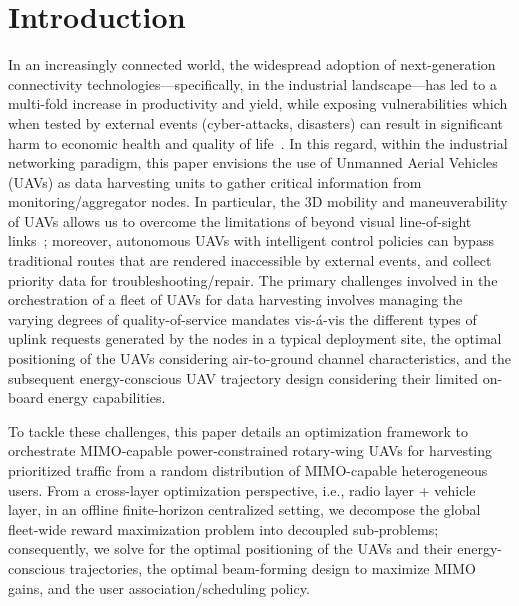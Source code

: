 \documentclass[10pt, twocolumn]{IEEEtran}
\begin{document}
\section{Introduction}\label{S1}
In an increasingly connected world, the widespread adoption of next-generation connectivity technologies---specifically, in the industrial landscape---has led to a multi-fold increase in productivity and yield, while exposing vulnerabilities which when tested by external events (cyber-attacks, disasters) can result in significant harm to economic health and quality of life~\cite{Motivation_1, Motivation_2}. In this regard, within the industrial networking paradigm, this paper envisions the use of Unmanned Aerial Vehicles (UAVs) as data harvesting units to gather critical information from monitoring/aggregator nodes. In particular, the $3$D mobility and maneuverability of UAVs allows us to overcome the limitations of beyond visual line-of-sight links~\cite{MAESTRO_TCCN, SPAVE_ICC}; moreover, autonomous UAVs with intelligent control policies can bypass traditional routes that are rendered inaccessible by external events, and collect priority data for troubleshooting/repair. The primary challenges involved in the orchestration of a fleet of UAVs for data harvesting involves managing the varying degrees of quality-of-service mandates vis-\'{a}-vis the different types of uplink requests generated by the nodes in a typical deployment site, the optimal positioning of the UAVs considering air-to-ground channel characteristics, and the subsequent energy-conscious UAV trajectory design considering their limited on-board energy capabilities.

To tackle these challenges, this paper details an optimization framework to orchestrate MIMO-capable power-constrained rotary-wing UAVs for harvesting prioritized traffic from a random distribution of MIMO-capable heterogeneous users. From a cross-layer optimization perspective, i.e., radio layer + vehicle layer, in an offline finite-horizon centralized setting, we decompose the global fleet-wide reward maximization problem into decoupled sub-problems; consequently, we solve for the optimal positioning of the UAVs and their energy-conscious trajectories, the optimal beam-forming design to maximize MIMO gains, and the user association/scheduling policy.
\end{document}
